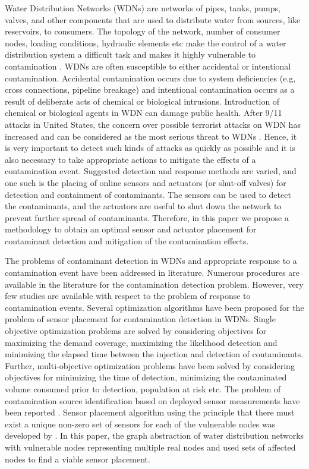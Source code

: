 \documentclass[authoryear,preprint,review,12pt]{elsarticle}
\begin{document}


Water Distribution Networks (WDNs) are networks of pipes, tanks, pumps,
valves, and other components that are used to distribute water from
sources, like reservoirs, to consumers. The  topology of the network, number of consumer nodes, loading conditions, hydraulic elements etc make the control of a water distribution system a
difficult task and makes it highly vulnerable to contamination \citep{Kessler}.  WDNs are often susceptible to either accidental or  intentional contamination. Accidental contamination occurs due to  system deficiencies (e.g, cross connections, pipeline breakage) and intentional contamination occurs as a result of deliberate acts of chemical or biological intrusions. Introduction of  chemical or biological agents in WDN can damage public health. After  9/11 attacks in United States, the
concern over  possible terrorist attacks on WDN has increased and can be considered as the most serious threat to WDNs \citep{BWSN}. Hence, it is very important to detect such kinds of attacks as quickly as possible  and it is also necessary to take appropriate actions to mitigate the effects of a contamination event. Suggested detection and response methods are varied, and one such is the placing of online sensors and actuators (or shut-off valves) for detection and containment of   contaminants.
The sensors can be used to detect the contaminants, and the actuators are useful to shut down the network to  prevent further spread of contaminants. Therefore, in this paper we propose a methodology to obtain an  optimal sensor and actuator placement  for contaminant detection and mitigation of the contamination effects.


The problems of contaminant detection in WDNs and appropriate response to a contamination event have been addressed in literature. Numerous procedures are available in the literature for the
 contamination detection problem. However, very few studies are available with respect to the problem of response to  contamination events. Several optimization algorithms have been proposed for the problem of sensor placement for contamination detection in WDNs. Single objective optimization problems\citep{Kessler, LEE, BERRY_FLEISCHER,  kumar} are solved by considering  objectives for maximizing the demand coverage,  maximizing the likelihood detection and minimizing the elapsed
  time between the injection and detection of contaminants. Further, multi-objective optimization problems \citep{BWSN, rico2007water,  Preis2008-Multiobjective, Watson04} have been solved by considering  objectives for minimizing the time of detection, minimizing the contaminated volume consumed prior to detection, population at risk etc. The problem of contamination source identification based on deployed sensor measurements have been reported \citep{mann2012real,Laird}. Sensor placement
  algorithm using the principle that there must exist a unique non-zero set
of sensors for each of the vulnerable nodes was developed by \cite{Palleti2016246}. In this paper,  the graph abstraction of water distribution networks with vulnerable nodes representing
multiple real nodes and used sets of affected nodes to find a viable sensor placement.
\end{document}

